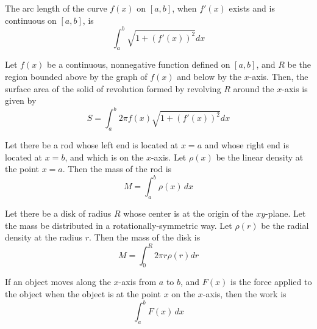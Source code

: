 \begin{theorem}
  The arc length of the curve $f(x)$ on $[a, b]$, when $f'(x)$ exists and is continuous on $[a, b]$, is
  \[
    \int_a^b \sqrt{1 + \left(f'(x)\right)^2} dx
  \]
\end{theorem}

\begin{theorem}
  Let $f(x)$ be a continuous, nonnegative function defined on $[a, b]$, and $R$ be the region bounded above by the graph of $f(x)$ and below by the $x$-axis. Then, the surface area of the solid of revolution formed by revolving $R$ around the $x$-axis is given by
  \[
    S = \int_a^b 2\pi f(x) \sqrt{1 + \left(f'(x)\right)^2} dx
  \]
\end{theorem}

\begin{theorem}
  Let there be a rod whose left end is located at $x = a$ and whose right end is located at $x = b$, and which is on the $x$-axis. Let $\rho(x)$ be the linear density at the point $x = a$. Then the mass of the rod is
  \[
    M = \int_a^b \rho(x) \,dx
  \]
\end{theorem}

\begin{theorem}
  Let there be a disk of radius $R$ whose center is at the origin of the $xy$-plane. Let the mass be distributed in a rotationally-symmetric way. Let $\rho(r)$ be the radial density at the radius $r$. Then the mass of the disk is 
  \[
    M = \int_0^R 2\pi r \rho(r) dr
  \]
\end{theorem}

\begin{theorem}[Work]
  If an object moves along the $x$-axis from $a$ to $b$, and $F(x)$ is the force applied to the object when the object is at the point $x$ on the $x$-axis, then the work is
  \[
    \int_a^b F(x) \,dx
  \]
\end{theorem}
